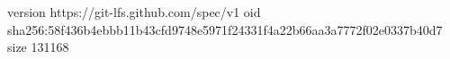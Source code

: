 version https://git-lfs.github.com/spec/v1
oid sha256:58f436b4ebbb11b43cfd9748e5971f24331f4a22b66aa3a7772f02e0337b40d7
size 131168
